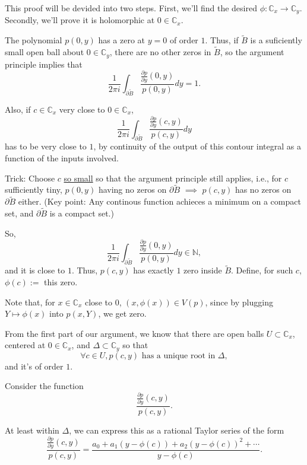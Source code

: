 
\begin{sk}
	This proof will be devided into two steps. First, we'll find the desired $\phi: \mathbb{C}_x \to \mathbb{C}_y$. Secondly, we'll prove it is holomorphic at $0 \in \mathbb{C}_x$.

	The polynomial $p(0, y)$ has a zero at $y=0$ of order $1$. Thus, if $\tilde{B}$ is a suficiently small open ball about $0 \in \mathbb{C}_y$, there are no other zeros in $\tilde{B}$, so the argument principle implies that \[
		\frac{1}{2\pi i} \int_{\partial \tilde{B}} \frac{\frac{\partial p}{\partial y}(0, y)}{p(0, y)} dy = 1.
	\]

	Also, if $c \in \mathbb{C}_x$ very close to $0 \in \mathbb{C}_x$, \[
		\frac1{2\pi i} \int_{\partial \tilde{B}} \frac{\frac{\partial p}{\partial y}(c, y)}{p(c, y)} dy
	\] has to be very close to $1$, by continuity of the output of this contour integral as a function of the inputs involved.

	Trick: Choose $c$ \underline{so small} so that the argument principle still applies, i.e., for $c$ sufficiently tiny, $p(0, y)$ having no zeros on $\partial \tilde{B}$ $\implies$ $p(c, y)$ has no zeros on  $\partial \tilde{B}$ either. (Key point: Any continous function achieces a minimum on a compact set, and $\partial \tilde{B}$ is a compact set.)

	So, \[
		\frac{1}{2\pi i} \int_{\partial \tilde{B}} \frac{\frac{\partial p}{\partial y}(0, y)}{p(0, y)} dy \in \mathbb{N},
	\] and it is close to $1$. Thus, $p(c, y)$ has exactly $1$ zero inside $\tilde{B}$. Define, for such $c$, $\phi(c) :=$ this zero.

	Note that, for $x \in \mathbb{C}_x$ close to $0$,  $(x, \phi(x)) \in V(p)$, since by plugging $Y \mapsto \phi(x)$ into $p(x, Y)$, we get zero.

	From the first part of our argument, we know that there are open balls $U \subset \mathbb{C}_x$, centered at $0 \in \mathbb{C}_x$, and $\Delta \subset \mathbb{C}_y$ so that \[
		\forall c \in U, p(c, y) \text{ has a unique root in } \Delta,
	\]
	and it's of order $1$.

	Consider the function \[
		\frac{\frac{\partial p}{\partial y}(c, y)}{p(c, y)}.
	\]

	At least within $\Delta$, we can express this as a rational Taylor series of the form \[
		\frac{\frac{\partial p}{\partial y}(c, y)}{p(c, y)} = \frac{a_0 + a_1 (y - \phi(c)) + a_2(y - \phi(c))^2 + \cdots}{y - \phi(c)}.
	\]


\end{sk}
